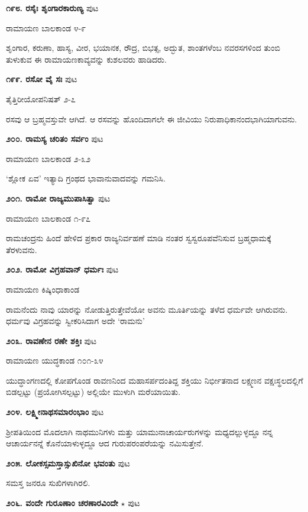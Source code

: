 {\medskip
\noindent\textbf{೧೯೮. ರಸೈಃ ಶೃಂಗಾರಕಾರುಣ್ಯ} \hfill ಪುಟ \pageref{188}

\hfill ರಾಮಾಯಣ ಬಾಲಕಾಂಡ ೪-೯

ಶೃಂಗಾರ, ಕರುಣಾ, ಹಾಸ್ಯ, ವೀರ, ಭಯಾನಕ, ರೌದ್ರ, ಬಿಭತ್ಸ, ಅದ್ಭುತ, ಶಾಂತಗಳೆಂಬ ನವರಸಗಳಿಂದ ತುಂಬಿ ತುಳುಕುವ ಈ ರಾಮಾಯಣಕಾವ್ಯವನ್ನು ಕುಶಲವರು ಹಾಡಿದರು.

\medskip
\noindent\textbf{೧೯೯. ರಸೋ ವೈ ಸಃ} \hfill ಪುಟ \pageref{76c}

\hfill ತೈತ್ತಿರೀಯೋಪನಿಷತ್ ೨-೭

ರಸವು ಆ ಬ್ರಹ್ಮವಸ್ತುವೇ ಆಗಿದೆ. ಆ ರಸವನ್ನು ಹೊಂದಿದಾಗಲೇ ಈ ಜೀವಿಯು ನಿರುಪಾಧಿಕಾನಂದಭಾಗಿಯಾಗುವನು.

\medskip
\noindent\textbf{೨೦೦. ರಾಮಸ್ಯ ಚರಿತಂ ಸರ್ವಂ} \hfill ಪುಟ \pageref{204c}

\hfill ರಾಮಾಯಣ ಬಾಲಕಾಂಡ ೨-೩೨

`ಶ್ಲೋಕ ಏವ' ಇತ್ಯಾದಿ ಗ್ರಂಥದ ಭಾವಾನುವಾದವನ್ನು ಗಮನಿಸಿ.

\medskip
\noindent\textbf{೨೦೧. ರಾಮೋ ರಾಜ್ಯಮುಪಾಸಿತ್ವಾ} \hfill ಪುಟ \pageref{253a}

\hfill ರಾಮಾಯಣ ಬಾಲಕಾಂಡ ೧-೯೭

ರಾಮಚಂದ್ರನು ಹಿಂದೆ ಹೇಳಿದ ಪ್ರಕಾರ ರಾಜ್ಯನಿರ್ವಹಣೆ ಮಾಡಿ ನಂತರ ಸ್ವಸ್ವರೂಪವೆನಿಸುವ ಬ್ರಹ್ಮಧಾಮಕ್ಕೆ ತೆರಳುವನು.

\medskip
\noindent\textbf{೨೦೨. ರಾಮೋ ವಿಗ್ರಹವಾನ್ ಧರ್ಮಃ} \hfill ಪುಟ \pageref{247}

\hfill ರಾಮಾಯಣ ಕಿಷ್ಕಿಂಧಾಕಾಂಡ

ರಾಮನೆಂದು ನಾವು ಯಾರನ್ನು ನೋಡುತ್ತಿರುತ್ತೇವೆಯೋ ಅವನು ಮೂರ್ತಿಯನ್ನು ತಳೆದ ಧರ್ಮವೇ ಆಗಿರುವನು. ಧರ್ಮವು ವಿಗ್ರಹವನ್ನು ಸ್ವೀಕರಿಸಿದಾಗ ಅದೇ `ರಾಮನು'

\medskip
\noindent\textbf{೨೦೩. ರಾವಣೇನ ರಣೇ ಶಕ್ತಿಃ} \hfill ಪುಟ \pageref{120}

\hfill ರಾಮಾಯಣ ಯುದ್ಧಕಾಂಡ ೧೦೧-೩೪

ಯುದ್ಧಾಂಗಣದಲ್ಲಿ ಕೋಪಗೊಂಡ ರಾವಣನಿಂದ ಮಹಾಸರ್ಪದಂತಿದ್ದ ಶಕ್ತಿಯು ನಿರ್ಭೀತನಾದ ಲಕ್ಷ್ಮಣನ ವಕ್ಷಃಸ್ಥಲದಲ್ಲಿಗೆ ಬಿಡಲ್ಪಟ್ಟು (ಪ್ರಯೋಗಿಸಲ್ಪಟ್ಟು) ಅಲ್ಲಿಯೇ ಮುಳುಗಿ ಮರೆಯಾಯಿತು.

\medskip
\noindent\textbf{೨೦೪. ಲಕ್ಷ್ಮೀನಾಥಸಮಾರಂಭಾಂ} \hfill ಪುಟ \pageref{48b}

\hfill ಶ್ರೀಪತಿಯಿಂದ ಮೊದಲಾಗಿ ನಾಥಮುನಿಗಳು ಮತ್ತು ಯಾಮುನಾಚಾರ್ಯರುಗಳನ್ನು ಮಧ್ಯದಲ್ಲುಳ್ಳದ್ದೂ ನನ್ನ ಆಚಾರ್ಯನನ್ನೆ ಕೊನೆಯಾಳುಳ್ಳದ್ದೂ ಆದ ಗುರುಪರಂಪರೆಯನ್ನು ನಮಿಸುತ್ತೇನೆ.

\medskip
\noindent\textbf{೨೦೫. ಲೋಕಸ್ಸಮಸ್ತಾಸ್ಸುಖಿನೋ ಭವಂತು} \hfill ಪುಟ \pageref{193b}

\hfill ಸಮಸ್ತ ಜನರೂ ಸುಖಿಗಳಾಗಿರಲಿ.

\medskip
\noindent\textbf{೨೦೬. ವಂದೇ ಗುರೂಣಾಂ ಚರಣಾರವಿಂದೇ} $\star$ \hfill ಪುಟ \pageref{180a}

}

